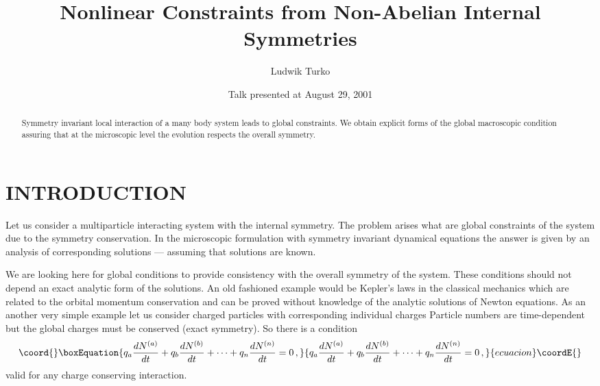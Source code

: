 \documentclass[a4paper,aps]{revtex4}
\begin{document}
\title{Nonlinear Constraints from Non-Abelian Internal Symmetries}%
\author{Ludwik Turko}
%
\date{Talk presented at August 29, 2001}
\begin{abstract}
Symmetry invariant local interaction of a many body system leads
to global constraints. We obtain explicit forms of the global
macroscopic condition assuring that at the microscopic level  the
evolution respects the overall symmetry.
\end{abstract}
\maketitle
\section{INTRODUCTION}

Let us consider a multiparticle interacting system with the internal
symmetry. The problem arises what are global constraints of the system
due to the symmetry conservation. In the microscopic formulation with
symmetry invariant dynamical equations the answer is given by an
analysis of corresponding solutions --- assuming that solutions are
known.

We are looking here for global conditions to provide consistency with
the overall symmetry of the system. These conditions should not depend
an exact analytic form of the solutions. An old fashioned example would
be Kepler's laws in the classical mechanics which are related to the
orbital momentum conservation and can be proved without knowledge of the
analytic solutions of Newton equations. As an another very simple
example let  us consider \coordHE{} charged
particles with corresponding individual charges \coordHE{}
Particle numbers are time-dependent but the global charges must be
conserved (exact \coordHE{} symmetry). So there is a condition
\begin{equation}\coord{}\boxEquation{\label{abcharge}
q_a\frac{d N^{(a)}}{dt} + q_b\frac{d
N^{(b)}}{dt}+ \cdots + q_n\frac{d N^{(n)}}{dt} = 0\,,
}{q_a\frac{d N^{(a)}}{dt} + q_b\frac{d
N^{(b)}}{dt}+ \cdots + q_n\frac{d N^{(n)}}{dt} = 0\,,
}{ecuacion}\coordE{}\end{equation}
valid for any charge conserving interaction.
\end{document}
